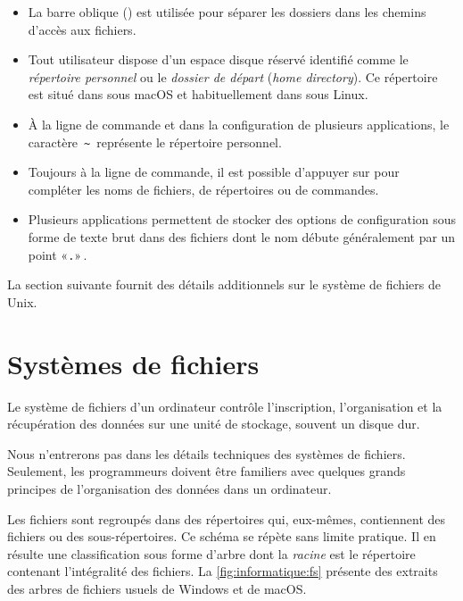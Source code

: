 \begin{itemize}
\item La barre oblique (\code{/}) est utilisée pour séparer les
  dossiers dans les chemins d'accès aux fichiers.
\item Tout utilisateur dispose d'un espace disque réservé identifié
  comme le \emph{répertoire personnel} ou
  le \emph{dossier
    de départ} (\emph{home directory}). Ce répertoire est situé dans
   sous macOS et habituellement dans  sous
  Linux.
\item À la ligne de commande et dans la configuration de plusieurs
  applications, le caractère \,\verb=~=\, représente le répertoire
  personnel.
\item Toujours à la ligne de commande, il est possible d'appuyer sur
   pour compléter les noms de fichiers, de répertoires ou de
  commandes.
\item Plusieurs applications permettent de stocker des options de
  configuration sous forme de texte brut dans des fichiers dont le nom
  débute généralement par un point «\verb=.=»\,.
\end{itemize}
La section suivante fournit des détails additionnels sur le système de
fichiers de Unix.


\section{Systèmes de fichiers}
\label{sec:informatique:fs}

Le système de fichiers d'un ordinateur
contrôle l'inscription, l'organisation et la récupération des données
sur une unité de stockage, souvent un disque dur.

Nous n'entrerons pas dans les détails techniques des systèmes de
fichiers. Seulement, les programmeurs doivent être familiers avec
quelques grands principes de l'organisation des données dans un
ordinateur.

Les fichiers sont regroupés dans des répertoires qui, eux-mêmes,
contiennent des fichiers ou des sous-répertoires. Ce schéma se répète
sans limite pratique. Il en résulte une classification sous forme
d'arbre dont la \emph{racine} est le répertoire contenant
l'intégralité des fichiers. La \autoref{fig:informatique:fs} présente
des extraits des arbres de fichiers usuels de Windows et de macOS.

